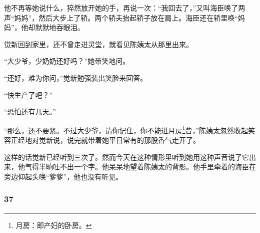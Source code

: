 \par 他不再等她说什么，猝然放开她的手，再说一次：“我回去了，”又叫海臣唤了两声“妈妈”，然后大步上了轿。两个轿夫抬起轿子放在肩上。海臣还在轿里唤“妈妈”，他却默默地吞眼泪。
\par 觉新回到家里，还不曾走进灵堂，就看见陈姨太从那里出来。
\par “大少爷，少奶奶还好吗？”她带笑地问。
\par “还好，难为你问，”觉新勉强装出笑脸来回答。
\par “快生产了吧？”
\par “恐怕还有几天。”
\par “那么，还不要紧。不过大少爷，请你记住，你不能进月房\footnote{月房：即产妇的卧房。}眥，”陈姨太忽然收起笑容正经地对觉新说，说完就带着她平日常有的那股香气走开了。
\par 这样的话觉新已经听到三次了。然而今天在这种情形里听到她用这种声音说了它出来，他气得半晌吐不出一个字。他呆呆地望着陈姨太的背影。他手里牵着的海臣在旁边仰起头唤“爹爹”，他也没有听见。



\subsubsection*{37}

